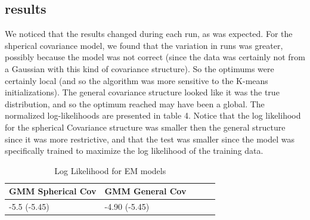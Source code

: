 \documentclass[paper=a4, fontsize=11pt]{scrartcl} %
\numberwithin{equation}{section} %
\numberwithin{figure}{section} %
\numberwithin{table}{section} %
\begin{document}
\subsection{results}

We noticed that the results changed during each run, as was expected. For the shperical covariance model, we found that the variation in runs was greater, possibly because the model was not correct (since the data was certainly not from a Gaussian with this kind of covariance structure). So the optimums were certainly local (and so the algorithm was more sensitive to the K-means initializations). The general covariance structure looked like it was the true distribution, and so the optimum reached may have been a global. The normalized log-likelihoods are presented in table 4. Notice that the log likelihood for the spherical Covariance structure was smaller then the general structure since it was more restrictive, and that the test was smaller since the model was specifically trained to maximize the log likelihood of the training data.

	\begin{table}
		\caption {Log Likelihood for EM models} \label{tab:title} 
		\begin{center}		
			\begin{tabular}{*5l}   
				\toprule
				GMM Spherical Cov & GMM General Cov
				\\\midrule
				-5.5 (-5.45) & -4.90 (-5.45) \\\bottomrule
				\hline
			\end{tabular}
		\end{center}
	\end{table}
\end{document}
